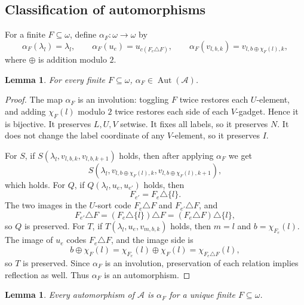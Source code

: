 \documentclass[12pt]{article}
\newtheorem{lemma}[theorem]{Lemma}
\theoremstyle{definition}
\theoremstyle{remark}
\newcommand{\Aut}{\operatorname{Aut}}
\begin{document}
\subsection{Classification of automorphisms}\label{sec:automorphisms}

For a finite \(F\subseteq\omega\), define \(\alpha_F:\omega\to\omega\) by
\[
\alpha_F(\lambda_l)=\lambda_l,\qquad
\alpha_F(u_e)=u_{c(F_e\triangle F)},\qquad
\alpha_F(v_{l,b,k})=v_{l,b\oplus\chi_F(l),k},
\]
where \(\oplus\) is addition modulo \(2\).

\begin{lemma}\label{lem:alpha-auto}
For every finite \(F\subseteq\omega\), \(\alpha_F\in\Aut(\mathcal A)\).
\end{lemma}

\begin{proof}
The map \(\alpha_F\) is an involution: toggling \(F\) twice restores each \(U\)-element, and adding \(\chi_F(l)\) modulo \(2\) twice restores each side of each \(V\)-gadget.  Hence it is bijective.  It preserves \(L,U,V\) setwise.  It fixes all labels, so it preserves \(N\).  It does not change the label coordinate of any \(V\)-element, so it preserves \(I\).

For \(S\), if \(S(\lambda_l,v_{l,b,k},v_{l,b,k+1})\) holds, then after applying \(\alpha_F\) we get
\[
S(\lambda_l,v_{l,b\oplus\chi_F(l),k},v_{l,b\oplus\chi_F(l),k+1}),
\]
which holds.  For \(Q\), if \(Q(\lambda_l,u_e,u_{e'})\) holds, then
\[
F_{e'}=F_e\triangle\{l\}.
\]
The two images in the \(U\)-sort code \(F_e\triangle F\) and \(F_{e'}\triangle F\), and
\[
F_{e'}\triangle F=(F_e\triangle\{l\})\triangle F=(F_e\triangle F)\triangle\{l\},
\]
so \(Q\) is preserved.  For \(T\), if \(T(\lambda_l,u_e,v_{m,b,k})\) holds, then \(m=l\) and \(b=\chi_{F_e}(l)\).  The image of \(u_e\) codes \(F_e\triangle F\), and the image side is
\[
b\oplus\chi_F(l)=\chi_{F_e}(l)\oplus\chi_F(l)=\chi_{F_e\triangle F}(l),
\]
so \(T\) is preserved.  Since \(\alpha_F\) is an involution, preservation of each relation implies reflection as well.  Thus \(\alpha_F\) is an automorphism.
\end{proof}

\begin{lemma}\label{lem:all-aut}
Every automorphism of \(\mathcal A\) is \(\alpha_F\) for a unique finite \(F\subseteq\omega\).
\end{lemma}
\end{document}
